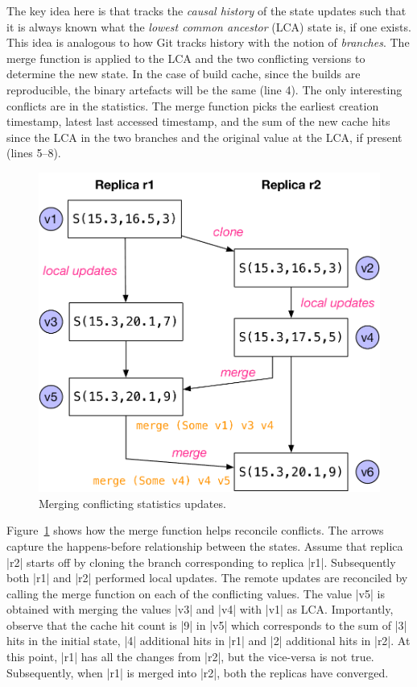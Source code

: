 The key idea here is that \name tracks the \emph{causal history} of the state
updates such that it is always known what the \emph{lowest common ancestor}
(LCA) state is, if one exists. This idea is analogous to how Git tracks history
with the notion of \emph{branches}. The merge function is applied to the LCA
and the two conflicting versions to determine the new state. In the case of
build cache, since the builds are reproducible, the binary artefacts will be
the same (line 4). The only interesting conflicts are in the statistics. The
merge function picks the earliest creation timestamp, latest last accessed
timestamp, and the sum of the new cache hits since the LCA in the two branches
and the original value at the LCA, if present (lines 5--8).

\begin{figure}
	\vspace{-0.9cm}
	\centering
	\includegraphics[scale=0.4]{figures/replica_merge}
	\caption{Merging conflicting statistics updates.}
	\label{fig:replica_merge}
	\vspace{-0.8cm}
\end{figure}
Figure~\ref{fig:replica_merge} shows how the merge function helps reconcile
conflicts. The arrows capture the happens-before relationship between the
states. Assume that replica |r2| starts off by cloning the branch corresponding
to replica |r1|. Subsequently both |r1| and |r2| performed local updates. The
remote updates are reconciled by calling the merge function on each of the
conflicting values. The value |v5| is obtained with merging the values |v3| and
|v4| with |v1| as LCA. Importantly, observe that the cache hit count is |9| in
|v5| which corresponds to the sum of |3| hits in the initial state, |4|
additional hits in |r1| and |2| additional hits in |r2|. At this point, |r1|
has all the changes from |r2|, but the vice-versa is not true. Subsequently,
when |r1| is merged into |r2|, both the replicas have converged.

